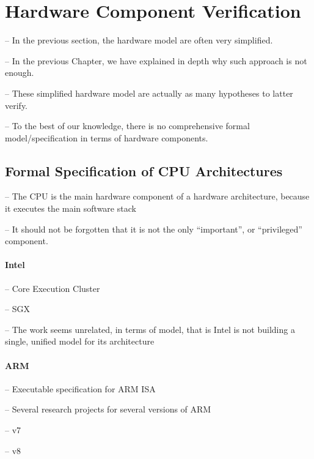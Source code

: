 \section{Hardware Component Verification} %
\label{sec:relatedwork:hardware}

\begin{compactitem}
\item[--] In the previous section, the hardware model are often very simplified.
\item[--] In the previous Chapter, we have explained in depth why such approach
  is not enough.
\item[--] These simplified hardware model are actually as many hypotheses to
  latter verify.
\item[--] To the best of our knowledge, there is no comprehensive formal
  model/specification in terms of hardware components.
\end{compactitem}

\subsection{Formal Specification of CPU Architectures}

\begin{compactitem}
\item[--] The CPU is the main hardware component of a hardware architecture,
  because it executes the main software stack
\item[--] It should not be forgotten that it is not the only ``important'', or
  ``privileged'' component.
\end{compactitem}

\paragraph{Intel}
%
\begin{compactitem}
\item[--] Core Execution Cluster\,\cite{kaivola2009formalintel}
\item[--] SGX\,\cite{leslie2015sgx}
\item[--] The work seems unrelated, in terms of model, that is Intel is not
  building a single, unified model for its architecture
\end{compactitem}

\paragraph{ARM}
%
\begin{compactitem}
\item[--] Executable specification for ARM ISA
\item[--] Several research projects for several versions of ARM
  \begin{compactitem}
  \item[--] v7\,\cite{fox2010armv7}
  \item[--] v8\,\cite{reid2016armv8}
  \end{compactitem}
\end{compactitem}

